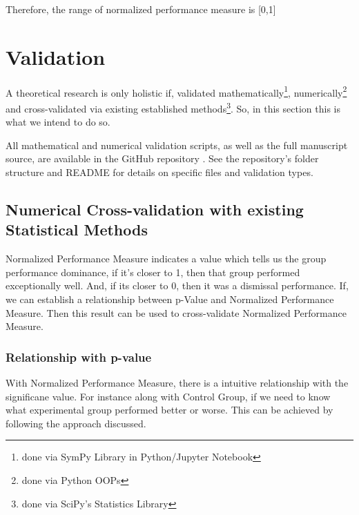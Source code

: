\documentclass[a4paper,fleqn,review]{cas-sc}
\begin{document}
Therefore, the range of normalized performance measure is [0,1]


\section{Validation}
A theoretical research is only holistic if, validated mathematically\footnote{done via SymPy Library in Python/Jupyter Notebook}, numerically\footnote{done via Python OOPs} and cross-validated via existing established methods\footnote{done via SciPy's Statistics Library}. So, in this section this is what we intend to do so.

All mathematical and numerical validation scripts, as well as the full manuscript source, are available in the GitHub repository \cite{silentkarmi2025normalized}. See the repository's folder structure and README for details on specific files and validation types.

\subsection{Numerical Cross-validation with existing Statistical Methods}
Normalized Performance Measure indicates a value which tells us the group performance dominance, if it's closer to 1, then that group performed exceptionally well. And, if its closer to 0, then it was a dismissal performance. If, we can establish a relationship between p-Value and Normalized Performance Measure. Then this result can be used to cross-validate Normalized Performance Measure.

\subsubsection{Relationship with p-value}
With Normalized Performance Measure, there is a intuitive relationship with the significane value. For instance along with Control Group, if we need to know what experimental group performed better or worse. This can be achieved by following the approach discussed.
\end{document}
